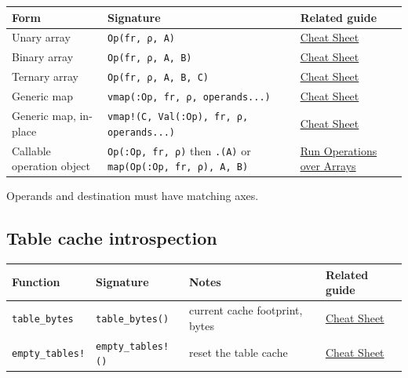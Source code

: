 \label{1032371883808262493}{}



\begin{table}[h]
\centering
\begin{tabulary}{\linewidth}{L L L}
\toprule
Form & Signature & Related guide \\
\toprule
Unary array & \texttt{Op(fr, ρ, A)} & \href{help\_\allowbreak{}cheat\_\allowbreak{}sheet.md}{Cheat Sheet} \\
Binary array & \texttt{Op(fr, ρ, A, B)} & \href{help\_\allowbreak{}cheat\_\allowbreak{}sheet.md}{Cheat Sheet} \\
Ternary array & \texttt{Op(fr, ρ, A, B, C)} & \href{help\_\allowbreak{}cheat\_\allowbreak{}sheet.md}{Cheat Sheet} \\
Generic map & \texttt{vmap(\allowbreak{}:Op, fr, ρ, operands...)} & \href{help\_\allowbreak{}cheat\_\allowbreak{}sheet.md}{Cheat Sheet} \\
Generic map, in-place & \texttt{vmap!(\allowbreak{}C, Val(\allowbreak{}:Op), fr, ρ, operands...)} & \href{help\_\allowbreak{}cheat\_\allowbreak{}sheet.md}{Cheat Sheet} \\
Callable operation object & \texttt{Op(:Op, fr, ρ)} then \texttt{.(A)} or \texttt{map(\allowbreak{}Op(\allowbreak{}:Op, fr, ρ), A, B)} & \href{workflow\_\allowbreak{}arrays.md}{Run Operations over Arrays} \\
\bottomrule
\end{tabulary}

\end{table}



Operands and destination must have matching axes.



\subsection{Table cache introspection}



\label{14157903985024423279}{}



\begin{table}[h]
\centering
\begin{tabulary}{\linewidth}{L L L L}
\toprule
Function & Signature & Notes & Related guide \\
\toprule
\texttt{table\_\allowbreak{}bytes} & \texttt{table\_\allowbreak{}bytes()} & current cache footprint, bytes & \href{help\_\allowbreak{}cheat\_\allowbreak{}sheet.md}{Cheat Sheet} \\
\texttt{empty\_\allowbreak{}tables!} & \texttt{empty\_\allowbreak{}tables!()} & reset the table cache & \href{help\_\allowbreak{}cheat\_\allowbreak{}sheet.md}{Cheat Sheet} \\
\bottomrule
\end{tabulary}

\end{table}



